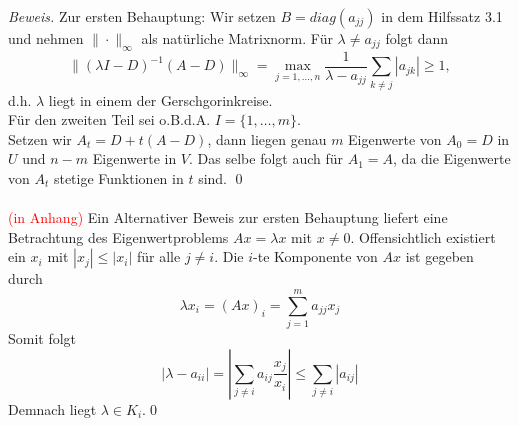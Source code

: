 \documentclass{article}
\begin{document}
    \textit{Beweis.} Zur ersten Behauptung: Wir setzen $B=diag(a_{jj})$ in dem Hilfssatz 3.1 und nehmen 
    $\|\cdot\|_\infty$ als natürliche Matrixnorm. Für $\lambda\neq a_{jj}$ folgt dann 
    \[\|(\lambda I -D)^{-1}(A-D)\|_\infty = \max_{j=1,\dotsc,n}\dfrac{1}{\lambda-a_{jj}}\sum_{k\neq j} |a_{jk}|\geq 1,\]
    d.h. $\lambda$ liegt in einem der Gerschgorinkreise. \\
    Für den zweiten Teil sei o.B.d.A. $I=\{1,\dotsc,m\}$. \\
    Setzen wir $A_t = D + t(A-D)$, dann liegen genau $m$ Eigenwerte von $A_0=D$ in $U$ und $n-m$ 
    Eigenwerte in $V$. Das selbe folgt auch für $A_1=A$, da die Eigenwerte von $A_t$ stetige Funktionen in $t$ sind. 
    \qed \\ \\
    \textcolor{red}{(in Anhang)} Ein Alternativer Beweis zur ersten Behauptung liefert eine Betrachtung des 
    Eigenwertproblems $Ax=\lambda x$ mit $x\neq 0$. Offensichtlich existiert ein $x_i$ mit $|x_j|\leq |x_i|$ für alle 
    $j\neq i$. Die $i$-te Komponente von $Ax$ ist gegeben durch 
    \[\lambda x_i = (Ax)_i = \sum_{j=1}^{m} a_{jj}x_j \]
    Somit folgt 
    \[|\lambda-a_{ii}| = \left|\sum_{j\neq i} a_{ij} \dfrac{x_j}{x_i}\right|\leq \sum_{j\neq i}|a_{ij}|\]
    Demnach liegt $\lambda\in K_i$.\qed
\end{document}
